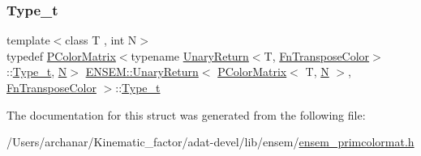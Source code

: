 \subsubsection{\texorpdfstring{Type\_t}{Type\_t}\hspace{0.1cm}{\footnotesize\ttfamily [3/3]}}
{\footnotesize\ttfamily template$<$class T , int N$>$ \\
typedef \mbox{\hyperlink{classENSEM_1_1PColorMatrix}{P\+Color\+Matrix}}$<$typename \mbox{\hyperlink{structENSEM_1_1UnaryReturn}{Unary\+Return}}$<$T, \mbox{\hyperlink{structENSEM_1_1FnTransposeColor}{Fn\+Transpose\+Color}}$>$\+::\mbox{\hyperlink{structENSEM_1_1UnaryReturn_3_01PColorMatrix_3_01T_00_01N_01_4_00_01FnTransposeColor_01_4_a572cabe45776b7d618458aa2b8d8a7ac}{Type\+\_\+t}}, \mbox{\hyperlink{adat__devel_2lib_2hadron_2operator__name__util_8cc_a7722c8ecbb62d99aee7ce68b1752f337}{N}}$>$ \mbox{\hyperlink{structENSEM_1_1UnaryReturn}{E\+N\+S\+E\+M\+::\+Unary\+Return}}$<$ \mbox{\hyperlink{classENSEM_1_1PColorMatrix}{P\+Color\+Matrix}}$<$ T, \mbox{\hyperlink{adat__devel_2lib_2hadron_2operator__name__util_8cc_a7722c8ecbb62d99aee7ce68b1752f337}{N}} $>$, \mbox{\hyperlink{structENSEM_1_1FnTransposeColor}{Fn\+Transpose\+Color}} $>$\+::\mbox{\hyperlink{structENSEM_1_1UnaryReturn_3_01PColorMatrix_3_01T_00_01N_01_4_00_01FnTransposeColor_01_4_a572cabe45776b7d618458aa2b8d8a7ac}{Type\+\_\+t}}}



The documentation for this struct was generated from the following file\+:\begin{DoxyCompactItemize}
\item 
/\+Users/archanar/\+Kinematic\+\_\+factor/adat-\/devel/lib/ensem/\mbox{\hyperlink{adat-devel_2lib_2ensem_2ensem__primcolormat_8h}{ensem\+\_\+primcolormat.\+h}}\end{DoxyCompactItemize}
